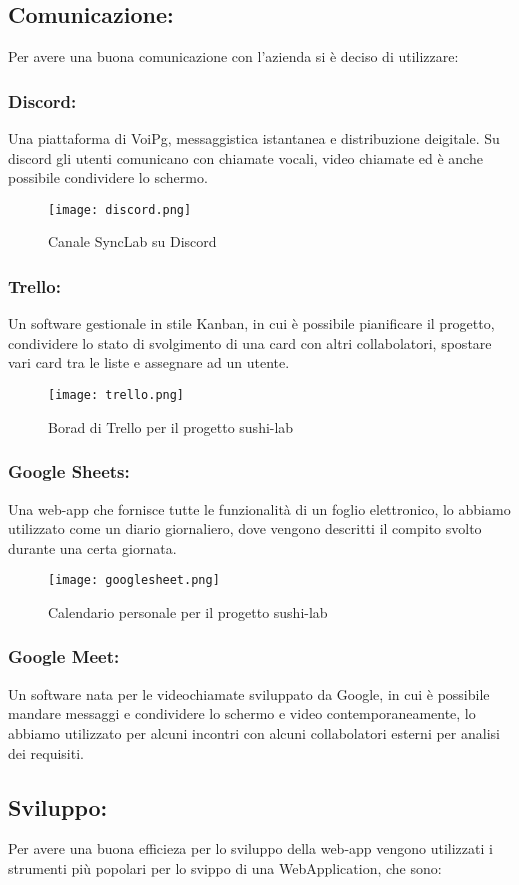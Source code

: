 \subsection{Comunicazione:}
Per avere una buona comunicazione con l'azienda si è deciso di utilizzare:
\subsubsection{Discord:}
Una piattaforma di \gls{VoiPg}, messaggistica istantanea e distribuzione deigitale. Su discord gli utenti comunicano con chiamate vocali, video chiamate ed è anche possibile condividere lo schermo.
\begin{figure}[H]
    \centering
    \texttt{[image: discord.png]}
    \caption{Canale SyncLab su Discord}
\end{figure}
\subsubsection{Trello:}
Un software gestionale in stile Kanban, in cui è possibile pianificare il progetto, condividere lo stato di svolgimento di una card con altri collabolatori, spostare vari card tra le liste e assegnare ad un utente.
\begin{figure}[H]
    \centering
    \texttt{[image: trello.png]}
    \caption{Borad di Trello per il progetto sushi-lab}
\end{figure}
\subsubsection{Google Sheets:}
Una web-app che fornisce tutte le funzionalità di un foglio elettronico, lo abbiamo utilizzato come un diario giornaliero, dove vengono descritti il compito svolto durante una certa giornata.
\begin{figure}[H]
    \centering
    \texttt{[image: googlesheet.png]}
    \caption{Calendario personale per il progetto sushi-lab}
\end{figure}
\subsubsection{Google Meet:}
Un software nata per le videochiamate sviluppato da Google, in cui è possibile mandare messaggi e condividere lo schermo e video contemporaneamente, lo abbiamo utilizzato per alcuni incontri con alcuni collabolatori esterni per analisi dei requisiti.
\subsection{Sviluppo:}
Per avere una buona efficieza per lo sviluppo della web-app vengono utilizzati i strumenti più popolari per lo svippo di una WebApplication, che sono:
